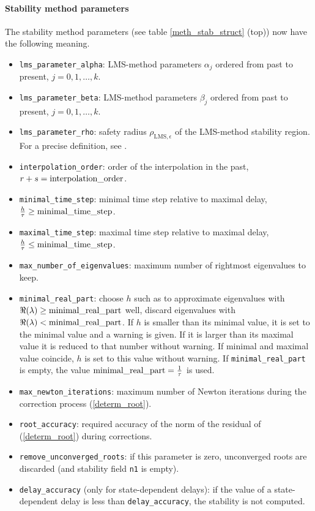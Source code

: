 \documentclass[10pt]{scrartcl}
\newcommand{\blist}[1]{\mbox{\lstinline!#1!}}
\begin{document}
{\paragraph{Stability method parameters}
The stability method parameters (see table \ref{meth_stab_struct}
(top)) now have the following meaning.
\begin{itemize}
\item \blist{lms_parameter_alpha}: LMS-method parameters $\alpha_j$ 
ordered from past to present, $j=0,1,\ldots,k$.
\item \blist{lms_parameter_beta}: LMS-method parameters $\beta_j$ 
ordered from past to present, $j=0,1,\ldots,k$.
\item \blist{lms_parameter_rho}: safety radius
  $\rho_{\mathrm{LMS},\epsilon}$ of the LMS-method stability region.
  For a precise definition, see \cite[\S III.3.2]{Enge00}.
\item \blist{interpolation_order}: order of the interpolation in the
past, $r+s=\blist{interpolation_order}$.
\item \blist{minimal_time_step}: minimal time step relative to maximal
delay, $\frac{h}{\tau}\geq\blist{minimal_time_step}$.
\item \blist{maximal_time_step}: maximal time step relative to maximal
delay, $\frac{h}{\tau}\leq\blist{minimal_time_step}$. 
\item \blist{max_number_of_eigenvalues}: maximum number of rightmost
eigenvalues to keep.
\item \blist{minimal_real_part}: choose $h$ such as to approximate
  eigenvalues with $\Re(\lambda)\geq \blist{minimal_real_part}$ well,
  discard eigenvalues with $\Re(\lambda)<\blist{minimal_real_part}$.
  If $h$ is smaller than its minimal value, it is set to the minimal
  value and a warning is given. If it is larger than its maximal value
  it is reduced to that number without warning.  If minimal and
  maximal value coincide, $h$ is set to this value without warning.
  If \blist{minimal_real_part} is empty, the value
  $\blist{minimal_real_part}=\frac{1}{\tau}$ is used.
\item \blist{max_newton_iterations}: maximum number of Newton
  iterations during the correction process (\ref{determ_root}).
\item \blist{root_accuracy}: required accuracy of the norm of the
  residual of (\ref{determ_root}) during corrections.
\item \blist{remove_unconverged_roots}: if this parameter is zero,
  unconverged roots are discarded (and stability field \blist{n1} is
  empty).
\item \blist{delay_accuracy} (only for state-dependent delays): if the
  value of a state-dependent delay is less than
  \blist{delay_accuracy}, the stability is not computed.
\end{itemize}

}
\end{document}
